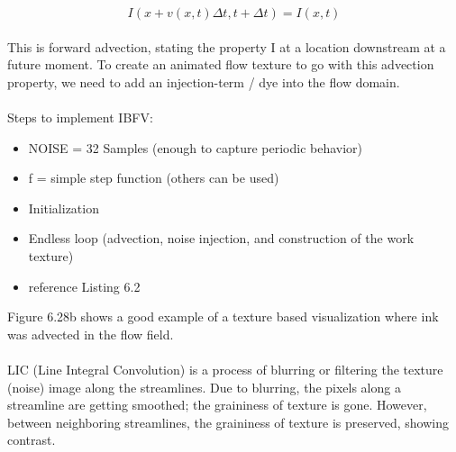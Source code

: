 \documentclass{article}
\begin{document}
\begin{equation}
    I(x+v(x,t)\Delta t, t+\Delta t) = I(x,t)
\end{equation}
\\
This is forward advection, stating the property I at a location downstream at a future moment. To create an animated flow texture to go with this advection property, we need to add an injection-term / dye into the flow domain. 
\\\\
Steps to implement IBFV:
\begin{itemize}
    \item NOISE = 32 Samples (enough to capture periodic behavior)
    \item f = simple step function (others can be used)
    \item Initialization
    \item Endless loop (advection, noise injection, and construction of the work texture)
    \item reference Listing 6.2
\end{itemize}
Figure 6.28b shows a good example of a texture based visualization where ink was advected in the flow field. 
\\\\
LIC (Line Integral Convolution) is a process of blurring or filtering the texture (noise) image along the streamlines. Due to blurring, the pixels along a streamline are getting smoothed; the graininess of texture is gone. However, between neighboring streamlines, the graininess of texture is preserved, showing contrast.

\end{document}
